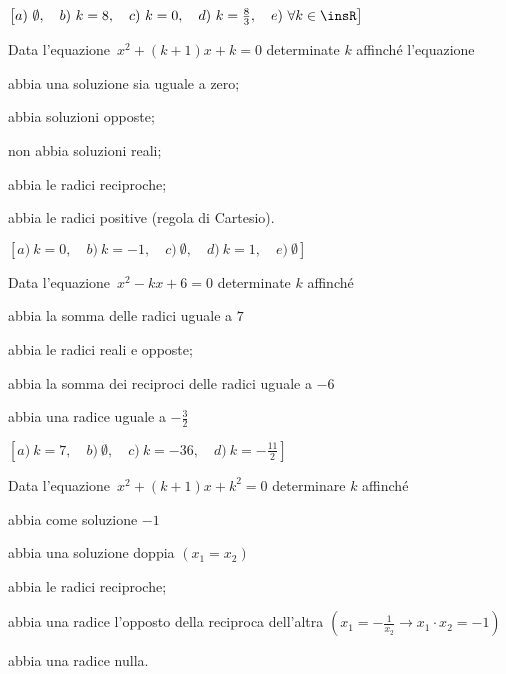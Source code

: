 \begin{flushright}
$\left[a)~\emptyset ,\quad b)~k = 8 ,\quad c)~ k = 0,\quad 
d)~k = \frac{8}{3} ,\quad e)~\forall k \in \insR\right]$
\end{flushright}

\begin{esercizio}[\Ast]
 \label{ese:3.99}
Data l'equazione~$x^{2} + (k + 1) x + k = 0$ determinate $k$ affinché 
l'equazione
\begin{enumeratea}
\item abbia una soluzione sia uguale a zero;~
\item abbia soluzioni opposte;~
\item non abbia soluzioni reali;~
\item abbia le radici reciproche;~
\item abbia le radici positive (regola di Cartesio).
\end{enumeratea}
\end{esercizio}

\begin{flushright}
$\left[a)~ k = 0 ,\quad b)~ k =-1 ,\quad c)~ \emptyset ,\quad 
d)~ k = 1 ,\quad e)~ \emptyset \right]$
\end{flushright}

\begin{esercizio}[\Ast]
 \label{ese:3.100}
Data l'equazione~$x^{2}-kx + 6 = 0$ determinate $k$ affinché
\begin{enumeratea}
\item abbia la somma delle radici uguale a $7$
\item abbia le radici reali e opposte;~
\item abbia la somma dei reciproci delle radici uguale a $-6$
\item abbia una radice uguale a $- \frac{3}{2}$
\end{enumeratea}
\end{esercizio}

\begin{flushright}
$\left[a)~ k = 7 ,\quad b)~ \emptyset ,\quad c)~ k =-36 ,\quad 
d)~ k =-\frac{11}{2} \right]$
\end{flushright}

\begin{esercizio}[\Ast]
 \label{ese:3.101}
Data l'equazione~$x^{2} + (k + 1) x + k^{2} = 0$ determinare $k$ affinché
\begin{enumeratea}
\item abbia come soluzione $-1$
\item abbia una soluzione doppia $(x_1 =x_2)$
\item abbia le radici reciproche;~
\item abbia una radice l'opposto della reciproca dell'altra 
$\left(x_1=-\frac{1}{x_2}\rightarrow x_1 \cdot x_2=-1\right)$
\item abbia una radice nulla.
\end{enumeratea}
\end{esercizio}

